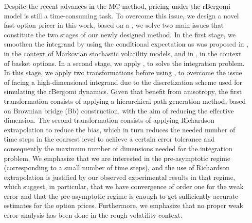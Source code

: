 Despite the recent advances in the MC method, pricing under the rBergomi model is still a time-consuming task. To overcome this issue,  we design  a novel fast option pricer in this work,  based on a  , we  solve two main issues that constitute the two stages of our newly designed method. In the first stage, we smoothen the integrand by using the conditional expectation as was proposed in \cite{romano1997contingent}, in the context of Markovian stochastic volatility  models, and in \cite{bayersmoothing}, in the context of basket options.   In a second stage, we apply , to solve the integration problem. In this stage, we apply two transformations before using , to overcome the issue of facing a high-dimensional integrand due to the discretization scheme used for simulating the rBergomi dynamics. Given that  benefit from anisotropy, the first transformation consists of applying a hierarchical  path generation method, based on Brownian
bridge (Bb) construction, with the aim of reducing the effective dimension. The second transformation consists of applying Richardson extrapolation to reduce the bias, which in turn reduces the needed number of time steps in the coarsest level to achieve a certain error tolerance and consequently  the maximum number of dimensions needed for the integration problem. We emphasize that we are interested in  the pre-asymptotic regime (corresponding to a small number of time steps), and the use of Richardson extrapolation is justified by our observed experimental results in that regime,  which suggest, in particular, that we have convergence of order one for the weak error and  that the pre-asymptotic regime is enough to get sufficiently accurate estimates for the option prices. Furthermore, we emphasize that no proper weak error analysis has been done in the rough volatility context.

